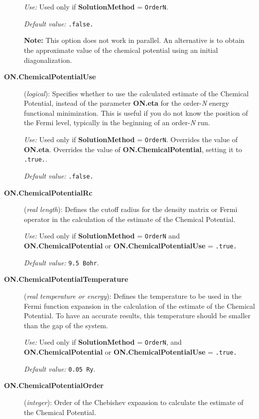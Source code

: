 \documentclass[11pt]{article}
\begin{document}
\begin{description}
{\it Use:} Used only if {\bf SolutionMethod} = {\tt OrderN}.

{\it Default value:} {\tt .false.}

{\bf Note:} This option does not work in parallel. An alternative
is to obtain the approximate value of the chemical potential using
an initial diagonalization.


\item[{\bf ON.ChemicalPotentialUse}] ({\it logical}): 
Specifies whether to use the calculated estimate of the
Chemical Potential, instead of the parameter 
{\bf ON.eta} 
for the order-{\it N} energy functional minimization.
This is useful if you do not know the position
of the Fermi level, typically in the beginning
of an order-{\em N} run.

{\it Use:} Used only if {\bf SolutionMethod} = {\tt OrderN}.
Overrides the value of {\bf ON.eta}.
Overrides the value of {\bf ON.ChemicalPotential}, setting
it to {\tt .true.}.

{\it Default value:} {\tt .false.}

\item[{\bf ON.ChemicalPotentialRc}]  ({\it real length}):
Defines the cutoff radius for the density matrix or Fermi
operator in the calculation of the estimate of the
Chemical Potential.

{\it Use:} Used only if {\bf SolutionMethod} = {\tt OrderN}
and {\bf ON.ChemicalPotential} or  {\bf ON.ChemicalPotentialUse} 
= {\tt .true.}

{\it Default value:} {\tt 9.5 Bohr}.

\item[{\bf ON.ChemicalPotentialTemperature}]  ({\it real temperature 
or energy}):
Defines the temperature to be used in the Fermi function expansion
in the calculation of the estimate of the Chemical Potential.
To have an accurate results, this temperature should be smaller 
than the gap of the system.

{\it Use:} Used only if {\bf SolutionMethod} = {\tt OrderN},
and {\bf ON.ChemicalPotential} or  {\bf ON.ChemicalPotentialUse} = 
{\tt .true.}

{\it Default value:} {\tt 0.05 Ry}.

\item[{\bf ON.ChemicalPotentialOrder}] ({\it integer}):
Order of the Chebishev expansion to calculate the estimate
of the Chemical Potential. 


\end{description}
\end{document}
